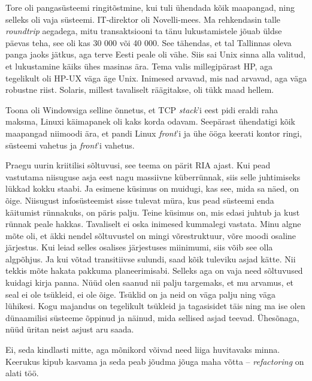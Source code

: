 Tore oli pangasüsteemi ringitõstmine, kui tuli ühendada kõik 
maapangad, ning selleks oli vaja süsteemi. 
IT-direktor oli 
Novelli-mees. Ma rehkendasin talle \emph{roundtrip} aegadega, mitu 
transaktsiooni ta tänu lukustamistele jõuab üldse päevas teha, see oli kas 30 
000 või 40 000. See tähendas, et tal Tallinnas oleva 
panga jaoks jätkus, aga terve Eesti peale oli vähe. Siis sai Unix sinna alla 
valitud, et lukustamine käiks ühes masinas ära. Tema valis millegipärast HP, aga
tegelikult oli HP-UX väga äge Unix. Inimesed arvavad, mis 
nad arvavad, aga väga robustne riist. Solaris, millest tavaliselt 
räägitakse, oli tükk maad hellem. 

Toona oli Windowsiga selline õnnetus, et TCP \emph{stack}'i eest 
pidi eraldi raha maksma, Linuxi käimapanek oli kaks korda odavam. Seepärast ühendatigi
kõik maapangad niimoodi ära, et pandi Linux \emph{front}'i ja 
ühe ööga keerati kontor ringi, süsteemi vahetus ja \emph{front}'i vahetus. 


Praegu uurin kriitilisi sõltuvusi, see teema on pärit 
RIA ajast. 
Kui pead vastutama niisuguse asja eest nagu massiivne küberrünnak, siis 
selle juhtimiseks lükkad kokku staabi. Ja esimene küsimus on muidugi, kas see, mida sa näed, on õige. Niisugust infosüsteemist 
sisse tulevat müra, kus pead süsteemi enda käitumist rünnakuks, on 
päris palju. Teine küsimus on, mis edasi 
juhtub ja kust rünnak peale hakkas. Tavaliselt ei oska inimesed kummalegi 
vastata. Minu algne mõte oli, et äkki nendel sõltuvustel on mingi 
võrestruktuur, võre moodi osaline järjestus. Kui leiad
selles osalises järjestuses miinimumi, siis võib see olla algpõhjus. Ja kui võtad transitiivse 
sulundi, saad kõik tuleviku asjad kätte. Nii tekkis mõte hakata pakkuma 
planeerimisabi. Selleks aga on vaja 
need sõltuvused kuidagi kirja panna. Nüüd olen saanud nii palju targemaks, 
et mu arvamus, et seal ei ole tsükleid, ei ole õige. Tsüklid on ja neid on väga 
palju ning väga lühikesi. Kogu majandus on tegelikult tsükleid ja tagasisidet 
täis ning ma ise olen dünaamilisi süsteeme õppinud ja näinud, mida sellised asjad teevad. Ühesõnaga, nüüd üritan neist asjust aru saada.


Ei, seda kindlasti mitte, aga mõnikord võivad need liiga huvitavaks minna. 
Keerukus kipub kasvama ja seda peab jõudma
jõuga maha võtta -- \emph{refactoring} on alati töö.
